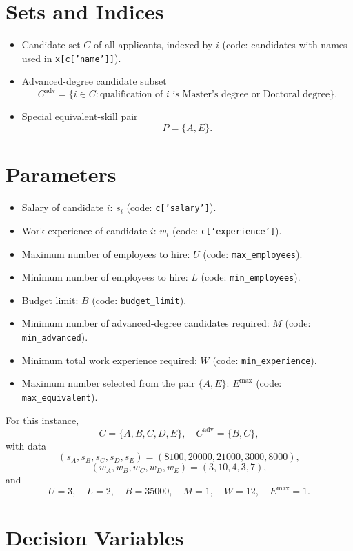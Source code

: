 \section*{Sets and Indices}

\begin{itemize}
    \item Candidate set $C$ of all applicants, indexed by $i$ (code: candidates with names used in \texttt{x[c['name']]}).
    \item Advanced-degree candidate subset
    \[
    C^{\mathrm{adv}}=\{i\in C:\text{qualification of }i\text{ is Master's degree or Doctoral degree}\}.
    \]
    \item Special equivalent-skill pair
    \[
    P=\{A,E\}.
    \]
\end{itemize}

\section*{Parameters}

\begin{itemize}
    \item Salary of candidate $i$: $s_i$ (code: \texttt{c['salary']}).
    \item Work experience of candidate $i$: $w_i$ (code: \texttt{c['experience']}).
    \item Maximum number of employees to hire: $U$ (code: \texttt{max\_employees}).
    \item Minimum number of employees to hire: $L$ (code: \texttt{min\_employees}).
    \item Budget limit: $B$ (code: \texttt{budget\_limit}).
    \item Minimum number of advanced-degree candidates required: $M$ (code: \texttt{min\_advanced}).
    \item Minimum total work experience required: $W$ (code: \texttt{min\_experience}).
    \item Maximum number selected from the pair $\{A,E\}$: $E^{\max}$ (code: \texttt{max\_equivalent}).
\end{itemize}

For this instance,
\[
C=\{A,B,C,D,E\},\quad
C^{\mathrm{adv}}=\{B,C\},
\]
with data
\[
(s_A,s_B,s_C,s_D,s_E)=(8100,20000,21000,3000,8000),
\]
\[
(w_A,w_B,w_C,w_D,w_E)=(3,10,4,3,7),
\]
and
\[
U=3,\quad L=2,\quad B=35000,\quad M=1,\quad W=12,\quad E^{\max}=1.
\]

\section*{Decision Variables}

